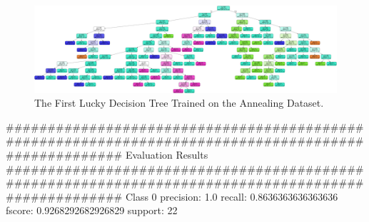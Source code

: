 \documentclass[12pt]{article}
\numberwithin{equation}{section}
\numberwithin{table}{section}
\numberwithin{figure}{section}
\begin{document}
\newpage
\begin{figure}
	\includegraphics[width=\textwidth]{dt1.png}
	\caption{The First Lucky Decision Tree Trained on the Annealing Dataset.}
	\label{fig:PropProf}
\end{figure}

\begin{python}
	####################################################################################################                                                                                                                                                                                  Evaluation Results                                                                                                                                                                                  ####################################################################################################                                                                                                                                                                                                                                                                                                                                                                                                                                                                                                                                                                                                                                   Class  0                                                                                                                                                                                                                                          precision:  1.0                                                                                                                                                                                                                              recall:  0.8636363636363636                                                                                                                                                                                                                  fscore:  0.9268292682926829                                                                                                                                                                                                                  support:  22                                                                                                                                                                                                                                                                                                                                                         
\end{python}
\end{document}
